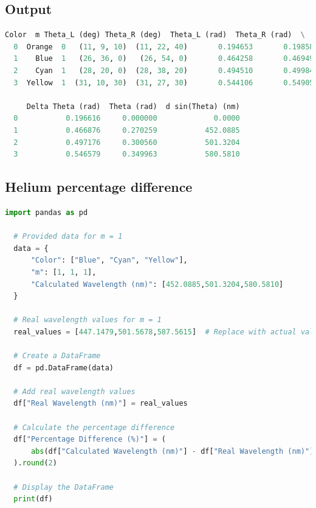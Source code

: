 \documentclass[a4paper,11pt]{article}
\begin{document}
\subsection*{Output}
\begin{lstlisting}[language=Python]
  Color  m Theta_L (deg) Theta_R (deg)  Theta_L (rad)  Theta_R (rad)  \
  0  Orange  0   (11, 9, 10)  (11, 22, 40)       0.194653       0.198580   
  1    Blue  1   (26, 36, 0)   (26, 54, 0)       0.464258       0.469494   
  2    Cyan  1   (28, 20, 0)  (28, 38, 20)       0.494510       0.499843   
  3  Yellow  1  (31, 10, 30)  (31, 27, 30)       0.544106       0.549051   
  
     Delta Theta (rad)  Theta (rad)  d sin(Theta) (nm)  
  0           0.196616     0.000000             0.0000  
  1           0.466876     0.270259           452.0885  
  2           0.497176     0.300560           501.3204  
  3           0.546579     0.349963           580.5810
\end{lstlisting}

\newpage
%
\subsection*{Helium percentage difference}
\begin{lstlisting}[language=Python]
  import pandas as pd

  # Provided data for m = 1
  data = {
      "Color": ["Blue", "Cyan", "Yellow"],
      "m": [1, 1, 1],
      "Calculated Wavelength (nm)": [452.0885,501.3204,580.5810]
  }
  
  # Real wavelength values for m = 1
  real_values = [447.1479,501.5678,587.5615]  # Replace with actual values
  
  # Create a DataFrame
  df = pd.DataFrame(data)
  
  # Add real wavelength values
  df["Real Wavelength (nm)"] = real_values
  
  # Calculate the percentage difference
  df["Percentage Difference (%)"] = (
      abs(df["Calculated Wavelength (nm)"] - df["Real Wavelength (nm)"]) / df["Real Wavelength (nm)"] * 100
  ).round(2)
  
  # Display the DataFrame
  print(df)
  
  
\end{lstlisting}
\newpage
\end{document}
